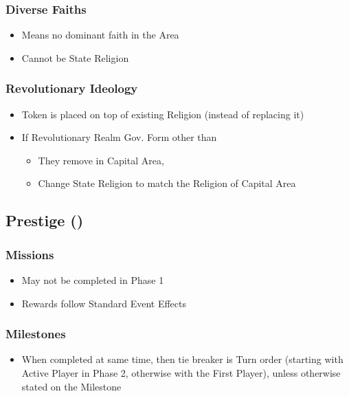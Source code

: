\documentclass[10pt]{article}
\begin{document}
\subsubsection*{Diverse Faiths}
\begin{itemize}
	\item Means no dominant faith in the Area
	\item Cannot be State Religion
\end{itemize}

\subsubsection*{Revolutionary Ideology}
\begin{itemize}
	\item Token is placed on top of existing Religion (instead of replacing it)
	\item If Revolutionary Realm  Gov. Form other than 
	\begin{itemize}
		\item They remove \revolution in Capital Area, 
		\item Change State Religion to match the Religion of Capital Area
	\end{itemize}
\end{itemize}

\subsection*{Prestige (\prestige) }

\subsubsection*{Missions}
\begin{itemize}
	\item May not be completed in Phase 1
	\item Rewards follow Standard Event Effects
\end{itemize}

\subsubsection*{Milestones}
\begin{itemize}
	\item When completed at same time, then tie breaker is Turn order (starting with Active Player in Phase 2, otherwise with the First Player), unless otherwise stated on the Milestone
\end{itemize}
\end{document}
